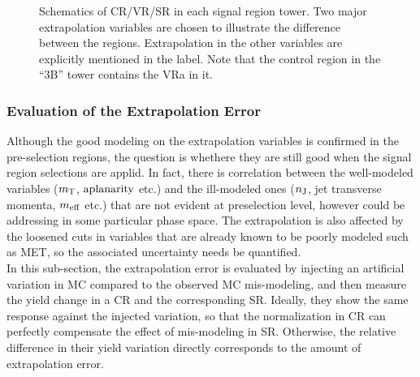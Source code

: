 \begin{figure}[h]
 \caption{ Schematics of CR/VR/SR in each signal region tower. Two major extrapolation variables are chosen to illustrate the difference between the regions. Extrapolation in the other variables are explicitly mentioned in the label. Note that the control region in the ``3B'' tower contains the VRa in it. 
   \label{fig::BGestimation::regionsPlot} 
 }
\end{figure}

\clearpage

%


\subsubsection{Evaluation of the Extrapolation Error} \label{sec::BGestimation::nonClosure_kineExtp}
Although the good modeling on the extrapolation variables is confirmed in the pre-selection regions, 
the question is whethere they are still good when the signal region selections are applid.
In fact, there is correlation between the well-modeled variables ($m_{\mathrm{T}}$, $\mathrm{aplanarity}$ etc.) and the ill-modeled ones ($n_{\mathrm{J}}$, jet transverse momenta, $m_{\mathrm{eff}}$ etc.) that are not evident at preselection level, however could be addressing in some particular phase space. 
The extrapolation is also affected by the loosened cuts in variables that are already known to be poorly modeled such as MET, so the associated uncertainty needs be quantified. \\

In this sub-section, the extrapolation error is evaluated by injecting an artificial variation in MC compared to the observed MC mis-modeling, and then measure the yield change in a CR and the corresponding SR. Ideally, they show the same response against the injected variation, so that the normalization in CR can perfectly compensate the effect of mis-modeling in SR. Otherwise, the relative difference in their yield variation directly corresponds to the amount of extrapolation error. \\

